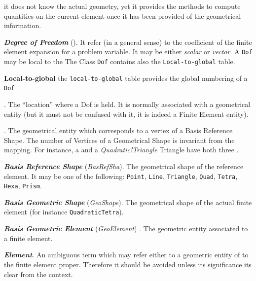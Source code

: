 \begin{description}
  it does not know the actual geometry, yet it provides the methods to
  compute quantities on the current element once it has been provided of
  the geometrical information.
\item \textbf{\emph{Degree of Freedom}}
  (\emph{}).  It refer (in a
  general sense) to the coefficient of the finite element expansion for
  a problem variable. It may be either
  \emph{scalar} or
  \emph{vector}. A \texttt{Dof} may be
  local to the \texttt{} The Class \texttt{Dof}
  contains also the \texttt{Local-to-global} table.
\item \textbf{Local-to-global} the
  \texttt{local-to-global} table provides the global numbering of a \texttt{Dof}
  
\item \textbf{\emph{}}. The ``location'' where a Dof
  is held. It is normally associated with a geometrical entity (but it
  must not be confused with it, it is indeed a Finite Element entity).
  
\item \textbf{\emph{}}. The geometrical entity
  which corresponds to a vertex of a Basis Reference Shape.  The
  number of Vertices of a Geometrical Shape is invariant from the
  mapping. For instance, a \emph{} and a \emph{Quadratic!Triangle}
  Triangle have both three \emph{}.
  
\item \textbf{\emph{Basis Reference Shape}} (\emph{BasRefSha}). The geometrical shape of the reference
  element. It may be one of the following: \texttt{Point},
  \texttt{Line}, \texttt{Triangle}, \texttt{Quad}, \texttt{Tetra},
  \texttt{Hexa}, \texttt{Prism}.
  
\item \textbf{\emph{Basis Geometric Shape}} (\emph{GeoShape}). The geometrical shape of the actual
  finite element (for instance \texttt{QuadraticTetra}).
  
\item \textbf{\emph{Basis Geometric Element}} (\emph{GeoElement})
  . The geometric entity associated to
  a finite element.

\item\textbf{\emph{Element}}. An ambiguous term which may refer either
  to a geometric entity of to the finite element proper. Therefore it
  should be avoided unless its significance its clear from the
  context.
  

\end{description}

